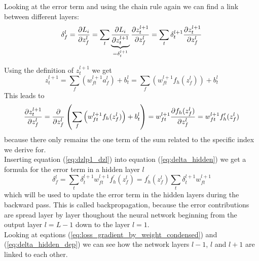 Looking at the error term and using the chain rule again we can find a link between
different layers:
\begin{equation}
    \delta_f^l = \frac{\partial {L_i}}{\partial {z_f^l}}
    = \sum\limits_t \underbrace{\frac{\partial {L_i}}{\partial {z_t^{l+1}}}}_{= \delta_t^{l+1}} \frac{\partial {z_t^{l+1}}}{\partial {z_f^l}} 
    = \sum\limits_t \delta_t^{l+1} \frac{\partial {z_t^{l+1}}}{\partial {z_f^l}}
    \label{eq:delta_hidden}
\end{equation} 

Using the definition of $z_t^{l+1}$ we get
\begin{equation}
    z_t^{l+1} = \sum\limits_f \left( w_{ft}^{l+1} a_f^l \right) + b_t^l
    = \sum\limits_f \left( w_{ft}^{l+1} f_h( z_f^l ) \right) + b_t^l
\end{equation}
This leads to
\begin{equation}
    \frac{\partial {z_t^{l+1}}}{\partial {z_f^l}}
    = \frac{\partial {}}{\partial {z_f^l}} \left( \sum\limits_f \left( w_{ft}^{l+1} f_h( z_f^l ) \right) + b_t^l \right)
    = w_{ft}^{l+1} \frac{\partial {f_h( z_f^l )}}{\partial {z_f^l}}
    = w_{ft}^{l+1} f_h^\prime( z_f^l )
    \label{eq:dzlp1_dzl}
\end{equation}
because there only remains the one term of the sum related to the specific index we derive
for. \\

Inserting equation (\ref{eq:dzlp1_dzl}) into equation (\ref{eq:delta_hidden}) we get a
formula for the error term in a hidden layer $l$
\begin{equation}
    \delta_f^l = \sum\limits_t \delta_t^{l+1} w_{ft}^{l+1} f_h^\prime( z_f^l )
    = f_h^\prime( z_f^l ) \sum\limits_t \delta_t^{l+1} w_{ft}^{l+1}
    \label{eq:delta_hidden_dep}
\end{equation}
which will be used to update the error term in the hidden layers during the backward pass.
This is called backpropagation, because the error contributions are spread layer by layer
thoughout the neural network beginning from the output layer $l=L-1$ down to the layer
$l=1$. \\

Looking at eqations (\ref{eq:loss_gradient_by_weight_condensed}) and
(\ref{eq:delta_hidden_dep}) we can see how the network layers $l-1$, $l$ and $l+1$ are
linked to each other.

\newpage